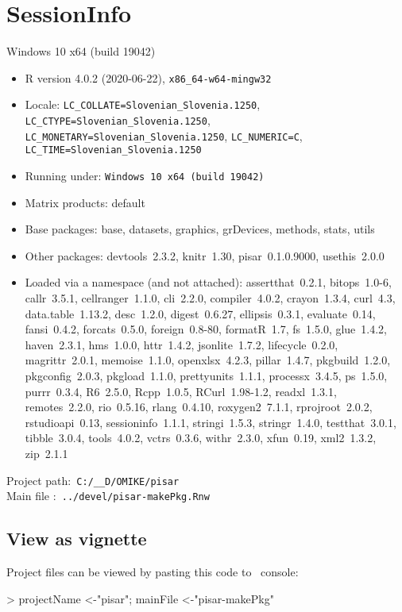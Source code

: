 \documentclass[a4paper,12pt]{article}\usepackage[]{graphicx}\usepackage[]{color}
\begin{document}
\section*{SessionInfo}
{\small
Windows 10 x64 (build 19042) 
\begin{itemize}\raggedright
  \item R version 4.0.2 (2020-06-22), \verb|x86_64-w64-mingw32|
  \item Locale: \verb|LC_COLLATE=Slovenian_Slovenia.1250|, \verb|LC_CTYPE=Slovenian_Slovenia.1250|, \verb|LC_MONETARY=Slovenian_Slovenia.1250|, \verb|LC_NUMERIC=C|, \verb|LC_TIME=Slovenian_Slovenia.1250|
  \item Running under: \verb|Windows 10 x64 (build 19042)|
  \item Matrix products: default
  \item Base packages: base, datasets, graphics, grDevices,
    methods, stats, utils
  \item Other packages: devtools~2.3.2, knitr~1.30,
    pisar~0.1.0.9000, usethis~2.0.0
  \item Loaded via a namespace (and not attached):
    assertthat~0.2.1, bitops~1.0-6, callr~3.5.1,
    cellranger~1.1.0, cli~2.2.0, compiler~4.0.2, crayon~1.3.4,
    curl~4.3, data.table~1.13.2, desc~1.2.0, digest~0.6.27,
    ellipsis~0.3.1, evaluate~0.14, fansi~0.4.2, forcats~0.5.0,
    foreign~0.8-80, formatR~1.7, fs~1.5.0, glue~1.4.2,
    haven~2.3.1, hms~1.0.0, httr~1.4.2, jsonlite~1.7.2,
    lifecycle~0.2.0, magrittr~2.0.1, memoise~1.1.0,
    openxlsx~4.2.3, pillar~1.4.7, pkgbuild~1.2.0,
    pkgconfig~2.0.3, pkgload~1.1.0, prettyunits~1.1.1,
    processx~3.4.5, ps~1.5.0, purrr~0.3.4, R6~2.5.0,
    Rcpp~1.0.5, RCurl~1.98-1.2, readxl~1.3.1, remotes~2.2.0,
    rio~0.5.16, rlang~0.4.10, roxygen2~7.1.1, rprojroot~2.0.2,
    rstudioapi~0.13, sessioninfo~1.1.1, stringi~1.5.3,
    stringr~1.4.0, testthat~3.0.1, tibble~3.0.4, tools~4.0.2,
    vctrs~0.3.6, withr~2.3.0, xfun~0.19, xml2~1.3.2, zip~2.1.1
\end{itemize}
Project path:\verb' C:/__D/OMIKE/pisar '\\
Main file :\verb' ../devel/pisar-makePkg.Rnw '


\subsection*{View as vignette}
Project files can be viewed by pasting this code to \R\ console:\\
\begin{Schunk}
\begin{Sinput}
> projectName <-"pisar";  mainFile <-"pisar-makePkg"


\end{Sinput}
\end{Schunk}}
\end{document}
